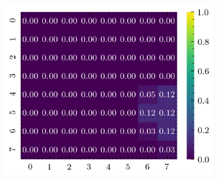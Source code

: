 \begin{figure}[H]
\begin{subfigure}[b]{0.19\textwidth}
        \includegraphics[width=\linewidth]{../img/5/quarry/best/heatmap-2d-4.png}
    \end{subfigure}  


\end{figure}
